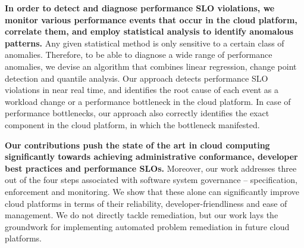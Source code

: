 \textbf{In order to detect and diagnose performance SLO violations,
we monitor various performance events that occur in the cloud platform,
correlate them, and employ statistical analysis to identify anomalous patterns.} Any given statistical
method is only sensitive to a certain class of anomalies. Therefore, to be able to diagnose a wide range of
performance anomalies, we devise an algorithm that combines linear regression, change point
detection and quantile analysis. Our approach detects performance SLO violations in near real time,
and identifies the root cause of each event as a workload change or a performance bottleneck
in the cloud platform. In case of performance bottlenecks, our approach also correctly identifies
the exact component in the cloud platform, in which the bottleneck manifested.

\textbf{Our contributions push the state of the art in cloud computing significantly towards achieving
administrative conformance, developer best practices and performance SLOs.} Moreover,
our work addresses three out of the four steps associated with software system governance --
specification, enforcement and monitoring. We show that these alone can significantly improve cloud platforms
in terms of their reliability, developer-friendliness and ease of management. 
We do not directly tackle remediation, but our work
lays the groundwork for implementing automated problem remediation in future cloud platforms.